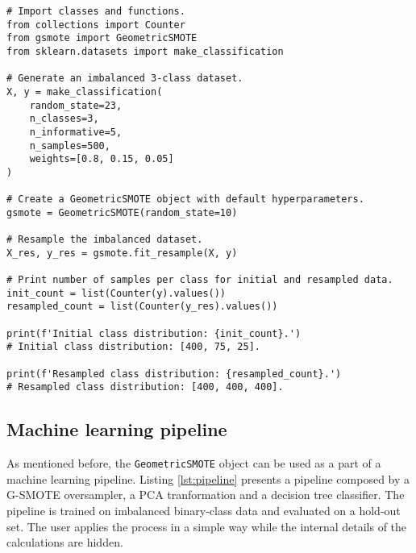 \documentclass[preprint,12pt, a4paper]{elsarticle}
\begin{document}
\begin{lstlisting}[caption={Resampling of imbalanced data using the \texttt{fit\_resample} method.},label={lst:basic}]
# Import classes and functions.
from collections import Counter
from gsmote import GeometricSMOTE
from sklearn.datasets import make_classification

# Generate an imbalanced 3-class dataset.
X, y = make_classification(
    random_state=23, 
    n_classes=3, 
    n_informative=5,
    n_samples=500,
    weights=[0.8, 0.15, 0.05]
)

# Create a GeometricSMOTE object with default hyperparameters.
gsmote = GeometricSMOTE(random_state=10)

# Resample the imbalanced dataset.
X_res, y_res = gsmote.fit_resample(X, y) 

# Print number of samples per class for initial and resampled data. 
init_count = list(Counter(y).values())
resampled_count = list(Counter(y_res).values())

print(f'Initial class distribution: {init_count}.') 
# Initial class distribution: [400, 75, 25].

print(f'Resampled class distribution: {resampled_count}.')
# Resampled class distribution: [400, 400, 400].
\end{lstlisting}

\subsection{Machine learning pipeline}

As mentioned before, the \texttt{GeometricSMOTE} object can be used as a part of a machine learning pipeline. Listing \ref{lst:pipeline} presents a pipeline composed by a G-SMOTE oversampler, a PCA tranformation and a decision tree classifier. The pipeline is trained on imbalanced binary-class data and evaluated on a hold-out set. The user applies the process in a simple way while the internal details of the calculations are hidden.
\end{document}
